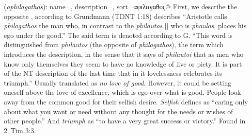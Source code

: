 \item[Selfish triumph,]

(\textit{aphilagathos}):
{
    name=,
    description={},
    sort=αφιλαγαθος@
}
First, we describe the opposite , according to Grundmann (TDNT 1:18) describes ``Aristotle calls \emph{philagathos} the man who, in contrast to the \emph{philautos} [] who is \emph{phaulos}, places his ego under the good.''
The said term is denoted according to G. ``This word is distinguished from \emph{philautos} (the opposite of  \emph{philagathos}),  the term which introduces the description, in the sense that it says of \emph{philautoi} that as men who know only themselves they seem to have no knowledge of live or piety. It is part of the NT description of the last time that in it lovelessness celebrates its triumph.''
Usually translated as \emph{no love of good}. However, it could be setting oneself above the love of excellence, which is ego over what is good. People look away from the common good for their selfish desire. \emph{Selfish} defines as ``caring only about what you want or need without any thought for the needs or wishes of other people.'' And \emph{triumph} as ``to have a very great success or victory.''
Found in 2~Tim 3:3.
